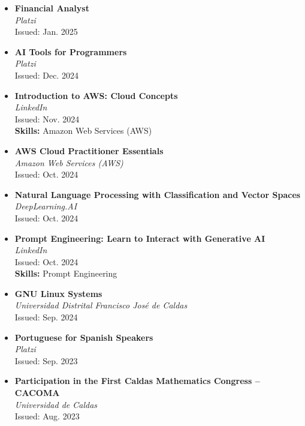 \documentclass[paper=a4,fontsize=11pt]{scrartcl} %
\begin{document}
\begin{itemize}[leftmargin=*, noitemsep]
  \item \textbf{Financial Analyst} \\
        \textit{Platzi} \\
        Issued: Jan. 2025 

  \item \textbf{AI Tools for Programmers} \\
        \textit{Platzi} \\
        Issued: Dec. 2024 

  \item \textbf{Introduction to AWS: Cloud Concepts} \\
        \textit{LinkedIn} \\
        Issued: Nov. 2024 \\
        \textbf{Skills:} Amazon Web Services (AWS) 

  \item \textbf{AWS Cloud Practitioner Essentials} \\
        \textit{Amazon Web Services (AWS)} \\
        Issued: Oct. 2024 

  \item \textbf{Natural Language Processing with Classification and Vector Spaces} \\
        \textit{DeepLearning.AI} \\
        Issued: Oct. 2024 

  \item \textbf{Prompt Engineering: Learn to Interact with Generative AI} \\
        \textit{LinkedIn} \\
        Issued: Oct. 2024 \\
        \textbf{Skills:} Prompt Engineering 

  \item \textbf{GNU Linux Systems} \\
        \textit{Universidad Distrital Francisco José de Caldas} \\
        Issued: Sep. 2024 

  \item \textbf{Portuguese for Spanish Speakers} \\
        \textit{Platzi} \\
        Issued: Sep. 2023 

  \item \textbf{Participation in the First Caldas Mathematics Congress – CACOMA} \\
        \textit{Universidad de Caldas} \\
        Issued: Aug. 2023


\end{itemize}
\end{document}

